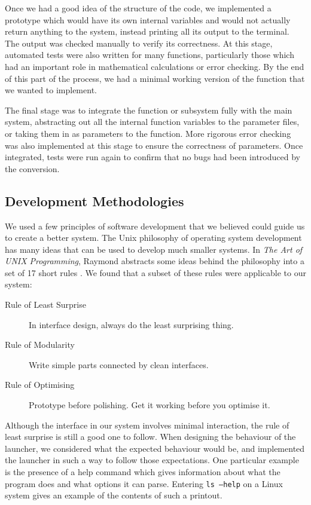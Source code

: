 \documentclass[a4paper,11pt,twoside]{article}
\begin{document}
   Once we had a good idea of the structure of the code, we implemented a
   prototype which would have its own internal variables and would not actually
   return anything to the system, instead printing all its output to the
   terminal. The output was checked manually to verify its correctness. At this
   stage, automated tests were also written for many functions, particularly
   those which had an important role in mathematical calculations or error
   checking. By the end of this part of the process, we had a minimal working
   version of the function that we wanted to implement.

   The final stage was to integrate the function or subsystem fully with the
   main system, abstracting out all the internal function variables to the
   parameter files, or taking them in as parameters to the function. More
   rigorous error checking was also implemented at this stage to ensure the
   correctness of parameters. Once integrated, tests were run again to confirm
   that no bugs had been introduced by the conversion.
\subsection{Development Methodologies}
\label{sec-7-2}

   We used a few principles of software development that we believed could guide
   us to create a better system. The Unix philosophy of operating system
   development has many ideas that can be used to develop much smaller
   systems. In \emph{The Art of UNIX Programming}, Raymond abstracts some ideas
   behind the philosophy into a set of 17 short rules \cite{artunix}. We found
   that a subset of these rules were applicable to our system:

   \begin{description}
   \item[Rule of Least Surprise] In interface design, always do the least
   surprising thing.
   \item[Rule of Modularity] Write simple parts connected by clean interfaces.
   \item[Rule of Optimising] Prototype before polishing. Get it working before
   you optimise it.
   \end{description}
   
   Although the interface in our system involves minimal interaction, the rule
   of least surprise is still a good one to follow. When designing the behaviour
   of the launcher, we considered what the expected behaviour would be, and
   implemented the launcher in such a way to follow those expectations. One
   particular example is the presence of a help command which gives information
   about what the program does and what options it can parse. Entering
   \texttt{ls --help} on a Linux system gives an example of the contents of such
   a printout.
\end{document}
